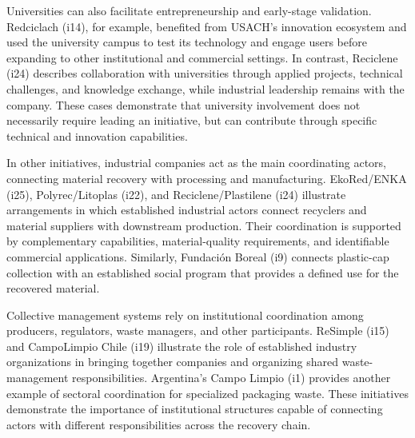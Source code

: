 \documentclass[
  12pt,
  oneside]{book}
\begin{document}
Universities can also facilitate entrepreneurship and early-stage
validation. Redciclach (i14), for example, benefited from USACH's
innovation ecosystem and used the university campus to test its
technology and engage users before expanding to other institutional and
commercial settings. In contrast, Reciclene (i24) describes
collaboration with universities through applied projects, technical
challenges, and knowledge exchange, while industrial leadership remains
with the company. These cases demonstrate that university involvement
does not necessarily require leading an initiative, but can contribute
through specific technical and innovation capabilities.

In other initiatives, industrial companies act as the main coordinating
actors, connecting material recovery with processing and manufacturing.
EkoRed/ENKA (i25), Polyrec/Litoplas (i22), and Reciclene/Plastilene
(i24) illustrate arrangements in which established industrial actors
connect recyclers and material suppliers with downstream production.
Their coordination is supported by complementary capabilities,
material-quality requirements, and identifiable commercial applications.
Similarly, Fundación Boreal (i9) connects plastic-cap collection with an
established social program that provides a defined use for the recovered
material.

Collective management systems rely on institutional coordination among
producers, regulators, waste managers, and other participants. ReSimple
(i15) and CampoLimpio Chile (i19) illustrate the role of established
industry organizations in bringing together companies and organizing
shared waste-management responsibilities. Argentina's Campo Limpio (i1)
provides another example of sectoral coordination for specialized
packaging waste. These initiatives demonstrate the importance of
institutional structures capable of connecting actors with different
responsibilities across the recovery chain.
\end{document}
